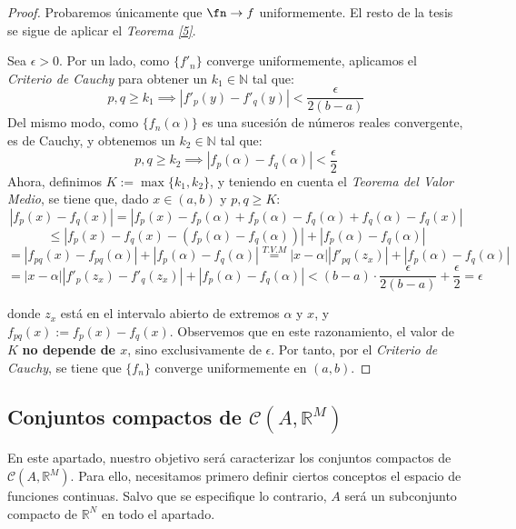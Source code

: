   \begin{proof}
    Probaremos únicamente que $\fn \to f$ uniformemente. El resto de la tesis se sigue de aplicar el \textit{Teorema \ref{5}}.

    Sea $\epsilon > 0$. Por un lado, como $\{f'_n\}$ converge uniformemente, aplicamos el \textit{Criterio de Cauchy} para obtener un $k_1 \in \mathbb{N}$ tal que: $$p,q \ge k_1 \implies |f'_p(y) - f'_q(y)| < \frac{\epsilon}{2 (b-a)}$$
    Del mismo modo, como $\{f_n(\alpha)\}$ es una sucesión de números reales convergente, es de Cauchy, y obtenemos un $k_2 \in \mathbb{N}$ tal que: $$p,q \ge k_2 \implies |f_p(\alpha) - f_q(\alpha)| < \frac{\epsilon}{2}$$
    Ahora, definimos $K := \max\{k_1, k_2\}$, y teniendo en cuenta el \textit{Teorema del Valor Medio}, se tiene que, dado $x \in (a,b)$ y $p,q \ge K$: $$|f_p(x) - f_q(x)| = |f_p(x) - f_p(\alpha) + f_p(\alpha) - f_q(\alpha) + f_q(\alpha) - f_q(x)|$$ $$\le |f_p(x) - f_q(x) - (f_p(\alpha) - f_q(\alpha))| + |f_p(\alpha) - f_q(\alpha)| $$ $$= |f_{pq}(x) - f_{pq}(\alpha)| + |f_p(\alpha) - f_q(\alpha)| \overset{T.V.M}{=} |x-\alpha||f'_{pq}(z_x)| + |f_p(\alpha) - f_q(\alpha)|$$ $$= \left|x-\alpha \right|\left| f'_p(z_x) - f'_q(z_x) \right| + |f_p(\alpha) - f_q(\alpha)| < (b-a) \cdot \frac{\epsilon}{2(b-a)} + \frac{\epsilon}{2} = \epsilon$$

    donde $z_x$ está en el intervalo abierto de extremos $\alpha$ y $x$, y $f_{pq}(x) := f_p(x) - f_q(x)$. Observemos que en este razonamiento, el valor de $K$ \textbf{no depende de $x$}, sino exclusivamente de $\epsilon$. Por tanto, por el \textit{Criterio de Cauchy}, se tiene que $\{f_n\}$ converge uniformemente en $(a,b)$.
  \end{proof}


  \subsection{Conjuntos compactos de $\mathcal{C}(A, \mathbb{R}^M)$}

En este apartado, nuestro objetivo será caracterizar los conjuntos compactos de $\mathcal{C}(A,\mathbb{R}^M)$. Para ello, necesitamos primero definir ciertos conceptos el espacio de funciones continuas. Salvo que se especifique lo contrario, $A$ será un subconjunto compacto de $\mathbb{R}^N$ en todo el apartado.

